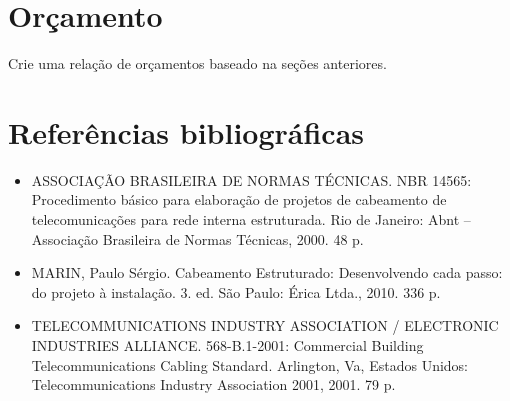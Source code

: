 \documentclass[	DIV=calc,%
							paper=a4,%
							fontsize=12pt,%
							onecolumn]{scrartcl}	 					%
\begin{document}

\section{Orçamento}
Crie uma relação de orçamentos baseado na seções anteriores.


\section{Referências bibliográficas}
\begin{itemize}
	\item ASSOCIAÇÃO BRASILEIRA DE NORMAS TÉCNICAS. NBR 14565: Procedimento básico para elaboração de projetos de cabeamento de telecomunicações para rede interna estruturada. Rio de Janeiro: Abnt – Associação Brasileira de Normas Técnicas, 2000. 48 p.
	
	\item MARIN, Paulo Sérgio. Cabeamento Estruturado: Desenvolvendo cada passo: do projeto à instalação. 3. ed. São Paulo: Érica Ltda., 2010. 336 p.
	
	\item TELECOMMUNICATIONS INDUSTRY ASSOCIATION / ELECTRONIC INDUSTRIES ALLIANCE. 568-B.1-2001: Commercial Building Telecommunications Cabling Standard. Arlington, Va, Estados Unidos: Telecommunications Industry Association 2001, 2001. 79 p.
	
\end{itemize}
\end{document}
